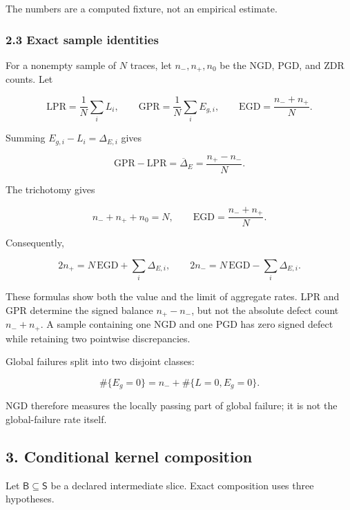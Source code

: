\documentclass[
  11pt,
]{article}
\theoremstyle{plain}
\theoremstyle{definition}\newtheorem{definition}[theorem]{Definition}
\theoremstyle{remark}\newtheorem*{remark}{Remark}
\begin{document}
The numbers are a computed fixture, not an empirical estimate.

\subsubsection{2.3 Exact sample identities}\label{exact-sample-identities}

For a nonempty sample of \(N\) traces, let \(n_-,n_+,n_0\) be the NGD, PGD,
and ZDR counts. Let

\[
\mathrm{LPR}=\frac1N\sum_i L_i,\qquad
\mathrm{GPR}=\frac1N\sum_i E_{g,i},\qquad
\mathrm{EGD}=\frac{n_-+n_+}{N}.
\]

Summing \(E_{g,i}-L_i=\Delta_{E,i}\) gives

\[
\mathrm{GPR}-\mathrm{LPR}
 =\overline{\Delta}_E
 =\frac{n_+-n_-}{N}.
\]

The trichotomy gives

\[
n_-+n_++n_0=N,\qquad
\mathrm{EGD}=\frac{n_-+n_+}{N}.
\]

Consequently,

\[
2n_+=N\,\mathrm{EGD}+\sum_i\Delta_{E,i},\qquad
2n_-=N\,\mathrm{EGD}-\sum_i\Delta_{E,i}.
\]

These formulas show both the value and the limit of aggregate rates. LPR and
GPR determine the signed balance \(n_+-n_-\), but not the absolute defect
count \(n_-+n_+\). A sample containing one NGD and one PGD has zero signed
defect while retaining two pointwise discrepancies.

Global failures split into two disjoint classes:

\[
\#\{E_g=0\}=n_-+\#\{L=0,E_g=0\}.
\]

NGD therefore measures the locally passing part of global failure; it is not
the global-failure rate itself.

\subsection{3. Conditional kernel composition}\label{conditional-kernel-composition}

Let \(\mathsf B\subseteq\mathsf S\) be a declared intermediate slice. Exact
composition uses three hypotheses.
\end{document}

